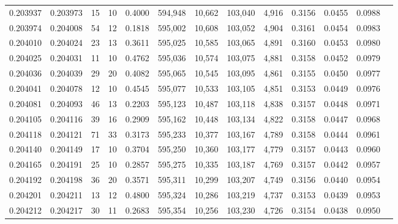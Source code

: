 \begin{tabular}{rrrrrrrrrrrrr}
0.203937 & 0.203973 &    15 &  10 &                                     0.4000 & 594,948 &  10,662 & 103,040 &   4,916 & 0.3156 & 0.0455 & 0.0988 \\
0.203974 & 0.204008 &    54 &  12 &                                     0.1818 & 595,002 &  10,608 & 103,052 &   4,904 & 0.3161 & 0.0454 & 0.0983 \\
0.204010 & 0.204024 &    23 &  13 &                                     0.3611 & 595,025 &  10,585 & 103,065 &   4,891 & 0.3160 & 0.0453 & 0.0980 \\
0.204025 & 0.204031 &    11 &  10 &                                     0.4762 & 595,036 &  10,574 & 103,075 &   4,881 & 0.3158 & 0.0452 & 0.0979 \\
0.204036 & 0.204039 &    29 &  20 &                                     0.4082 & 595,065 &  10,545 & 103,095 &   4,861 & 0.3155 & 0.0450 & 0.0977 \\
0.204041 & 0.204078 &    12 &  10 &                                     0.4545 & 595,077 &  10,533 & 103,105 &   4,851 & 0.3153 & 0.0449 & 0.0976 \\
0.204081 & 0.204093 &    46 &  13 &                                     0.2203 & 595,123 &  10,487 & 103,118 &   4,838 & 0.3157 & 0.0448 & 0.0971 \\
0.204105 & 0.204116 &    39 &  16 &                                     0.2909 & 595,162 &  10,448 & 103,134 &   4,822 & 0.3158 & 0.0447 & 0.0968 \\
0.204118 & 0.204121 &    71 &  33 &                                     0.3173 & 595,233 &  10,377 & 103,167 &   4,789 & 0.3158 & 0.0444 & 0.0961 \\
0.204140 & 0.204149 &    17 &  10 &                                     0.3704 & 595,250 &  10,360 & 103,177 &   4,779 & 0.3157 & 0.0443 & 0.0960 \\
0.204165 & 0.204191 &    25 &  10 &                                     0.2857 & 595,275 &  10,335 & 103,187 &   4,769 & 0.3157 & 0.0442 & 0.0957 \\
0.204192 & 0.204198 &    36 &  20 &                                     0.3571 & 595,311 &  10,299 & 103,207 &   4,749 & 0.3156 & 0.0440 & 0.0954 \\
0.204201 & 0.204211 &    13 &  12 &                                     0.4800 & 595,324 &  10,286 & 103,219 &   4,737 & 0.3153 & 0.0439 & 0.0953 \\
0.204212 & 0.204217 &    30 &  11 &                                     0.2683 & 595,354 &  10,256 & 103,230 &   4,726 & 0.3154 & 0.0438 & 0.0950 \\

\end{tabular}
